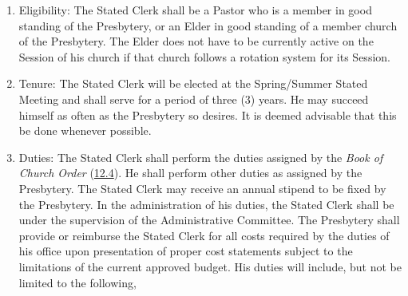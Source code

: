 \documentclass[
]{book}
\providecommand{\tightlist}{%
  \setlength{\itemsep}{0pt}\setlength{\parskip}{0pt}}
\begin{document}
\begin{enumerate}
  \begin{enumerate}
  \def\labelenumii{\arabic{enumii}.}
  \tightlist
  \item
    Eligibility: The Stated Clerk shall be a Pastor who is a member in good standing of the Presbytery, or an Elder in good standing of a member church of the Presbytery. The Elder does not have to be currently active on the Session of his church if that church follows a rotation system for its Session.
  \item
    Tenure: The Stated Clerk will be elected at the Spring/Summer Stated Meeting and shall serve for a period of three (3) years. He may succeed himself as often as the Presbytery so desires. It is deemed advisable that this be done whenever possible.
  \item
    Duties: The Stated Clerk shall perform the duties assigned by the \emph{Book of Church Order} (\href{https://bco.evangelpresbytery.com/form-of-government.html\#church-courtsin-general}{12.4}). He shall perform other duties as assigned by the Presbytery. The Stated Clerk may receive an annual stipend to be fixed by the Presbytery. In the administration of his duties, the Stated Clerk shall be under the supervision of the Administrative Committee. The Presbytery shall provide or reimburse the Stated Clerk for all costs required by the duties of his office upon presentation of proper cost statements subject to the limitations of the current approved budget. His duties will include, but not be limited to the following,


\end{enumerate}
\end{enumerate}
\end{document}
